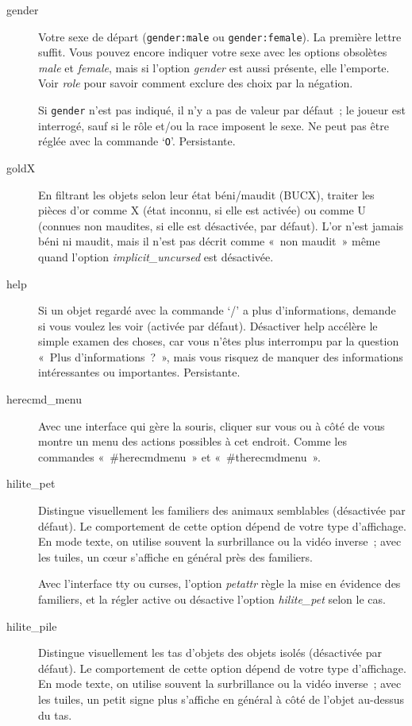 \documentclass[titlepage]{article}
\begin{document}
\begin{description}
\item[{gender}]
Votre sexe de départ (\texttt{gender:male} ou \texttt{gender:female}).
La première lettre suffit.
Vous pouvez encore indiquer votre sexe avec les options obsolètes
\textit{male}
et
\textit{female},
mais si l'option
\textit{gender}
est aussi présente, elle l'emporte.
Voir
\textit{role}
pour savoir comment exclure des choix par la négation.


Si \texttt{gender} n'est pas indiqué, il n'y a pas de valeur par défaut~;
le joueur est interrogé, sauf si le rôle et/ou la race imposent le sexe.
Ne peut pas être réglée avec la commande `\texttt{O}'.
Persistante.

\item[{goldX}]
En filtrant les objets selon leur état béni/maudit (BUCX), traiter les
pièces d'or comme X (état inconnu, si elle est activée) ou comme U (connues
non maudites, si elle est désactivée, par défaut).
L'or n'est jamais béni ni maudit, mais il n'est pas décrit comme «~non
maudit~» même quand l'option
\textit{implicit\_uncursed}
est désactivée.

\item[{help}]
Si un objet regardé avec la commande `/' a plus d'informations, demande
si vous voulez les voir (activée par défaut).
Désactiver help accélère le simple examen des choses, car vous n'êtes plus
interrompu par la question «~Plus d'informations~?~», mais vous
risquez de manquer des informations intéressantes ou importantes.
Persistante.

\item[{herecmd\_menu}]
Avec une interface qui gère la souris, cliquer sur vous ou à côté de vous
montre un menu des actions possibles à cet endroit.
Comme les commandes «~\#herecmdmenu~» et «~\#therecmdmenu~».

\item[{hilite\_pet}]
Distingue visuellement les familiers des animaux semblables (désactivée
par défaut).
Le comportement de cette option dépend de votre type d'affichage.
En mode texte, on utilise souvent la surbrillance ou la vidéo inverse~;
avec les tuiles, un cœur s'affiche en général près des familiers.


Avec l'interface tty ou curses, l'option
\textit{petattr}
règle la mise en évidence des familiers, et la régler active ou désactive
l'option
\textit{hilite\_pet}
selon le cas.

\item[{hilite\_pile}]
Distingue visuellement les tas d'objets des objets isolés (désactivée par
défaut).
Le comportement de cette option dépend de votre type d'affichage.
En mode texte, on utilise souvent la surbrillance ou la vidéo inverse~;
avec les tuiles, un petit signe plus s'affiche en général à côté de
l'objet au-dessus du tas.


\end{description}
\end{document}
